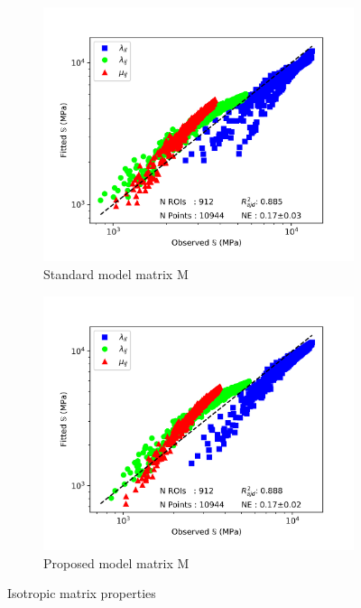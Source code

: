 \documentclass[a4paper,fleqn]{DC_ArtStyle}
\begin{document}
\begin{figure}[!h]
\begin{subfigure}[b]{0.45\linewidth}
			\includegraphics[width=\linewidth]{RegressionFabric_Isotropic_Mmat}
			\caption{Standard model matrix M}
		\end{subfigure}
		\begin{subfigure}[b]{0.45\linewidth}
			\includegraphics[width=\linewidth]{RegressionFabricK_Isotropic_Mmat}
			\caption{Proposed model matrix M}
		\end{subfigure}
		\caption{Isotropic matrix properties}
	\end{figure}
\end{document}
